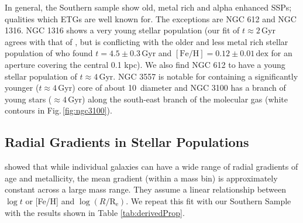 \documentclass[a4paper,fleqn,usenatbib]{mnras}
\begin{document}
	In general, the Southern sample show old, metal rich and alpha enhanced SSPs; qualities which ETGs are well known for. The exceptions are NGC 612 and NGC 1316. NGC 1316 shows a very young stellar population (our fit of $t \approx 2$\,Gyr agrees with that of \citealt{Kuntschner2000}, but is conflicting with the older and less metal rich stellar population of \citealt{Koleva2011} who found $t=4.5 \pm 0.3 \,\mathrm{Gyr}$ and $\mathrm{[Fe/H]}=0.12 \pm 0.01 \,\mathrm{dex}$ for an aperture covering the central 0.1 kpc). We also find NGC 612 to have a young stellar population of $t\approx 4\,\mathrm{Gyr}$. NGC 3557 is notable for containing a significantly younger ($t\approx 4$\,Gyr) core of about 10\arcsec\ diameter and NGC 3100 has a branch of young stars ($\approx 4$\,Gyr) along the south-east branch of the molecular gas (white contours in Fig.\,\ref{fig:ngc3100}).

	\subsection{Radial Gradients in Stellar Populations}
		\label{subsec:popGrad}

		\citet{Koleva2011} showed that while individual galaxies can have a wide range of radial gradients of age and metallicity, the mean gradient (within a mass bin) is approximately constant across a large mass range. They assume a linear relationship between $\log t$ or [Fe/H] and $\log (R/\mathrm{R_e})$. We repeat this fit with our Southern Sample with the results shown in Table \ref{tab:derivedProp}. 
\end{document}
